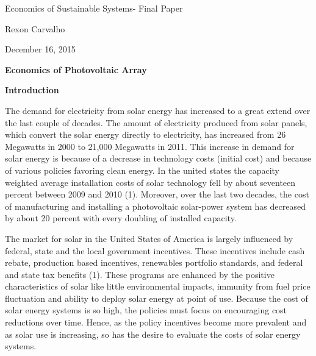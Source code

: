 \documentclass[12pt]{article}
\begin{document}
\begin{justify}
Economics of Sustainable Systems- Final Paper
\end{justify}\par

\begin{justify}
Rexon Carvalho
\end{justify}\par

\begin{justify}
December 16, 2015
\end{justify}\par


\vspace{\baselineskip}
\begin{Center}
\textbf{Economics of Photovoltaic Array}
\end{Center}\par


\vspace{\baselineskip}
\begin{justify}
\textbf{Introduction}
\end{justify}\par


\vspace{\baselineskip}
\begin{justify}
The demand for electricity from solar energy has increased to a great extend over the last couple of decades. The amount of electricity produced from solar panels, which convert the solar energy directly to electricity, has increased from 26 Megawatts in 2000 to 21,000 Megawatts in 2011. This increase in demand for solar energy is because of a decrease in technology costs (initial cost) and because of various policies favoring clean energy. In the united states the capacity weighted average installation costs of solar technology fell by about seventeen percent between 2009 and 2010 (1). Moreover, over the last two decades, the cost of manufacturing and installing a photovoltaic solar-power system has decreased by about 20 percent with every doubling of installed capacity.
\end{justify}\par


\vspace{\baselineskip}
\begin{justify}
The market for solar in the United States of America is largely influenced by federal, state and the local government incentives. These incentives include cash rebate, production based incentives, renewables portfolio standards, and federal and state tax benefits (1). These programs are enhanced by the positive characteristics of solar like little environmental impacts, immunity from fuel price fluctuation and ability to deploy solar energy at point of use. Because the cost of solar energy systems is so high, the policies must focus on encouraging cost reductions over time. Hence, as the policy incentives become more prevalent and as solar use is increasing, so has the desire to evaluate the costs of solar energy systems. 
\end{justify}\par
\end{document}
